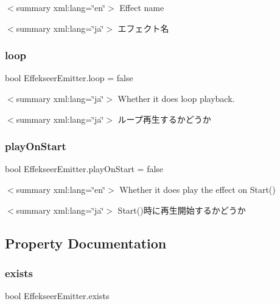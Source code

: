 $<$summary xml\+:lang=\char`\"{}en\char`\"{}$>$ Effect name 

$<$summary xml\+:lang=\char`\"{}ja\char`\"{}$>$ エフェクト名 \mbox{\label{class_effekseer_emitter_a9b6a18e54c4b4a68bb9b81fc88b123bd}} 
\subsubsection{\texorpdfstring{loop}{loop}}
{\footnotesize\ttfamily bool Effekseer\+Emitter.\+loop = false}

$<$summary xml\+:lang=\char`\"{}ja\char`\"{}$>$ Whether it does loop playback. 

$<$summary xml\+:lang=\char`\"{}ja\char`\"{}$>$ ループ再生するかどうか \mbox{\label{class_effekseer_emitter_a8ff5bc48852b4a21e3b33b0cd0e8b65a}} 
\subsubsection{\texorpdfstring{play\+On\+Start}{playOnStart}}
{\footnotesize\ttfamily bool Effekseer\+Emitter.\+play\+On\+Start = false}

$<$summary xml\+:lang=\char`\"{}en\char`\"{}$>$ Whether it does play the effect on Start() 

$<$summary xml\+:lang=\char`\"{}ja\char`\"{}$>$ Start()時に再生開始するかどうか 

\subsection{Property Documentation}
\mbox{\label{class_effekseer_emitter_aa4b49f6d532b7e75f2d207866ecee574}} 
\subsubsection{\texorpdfstring{exists}{exists}}
{\footnotesize\ttfamily bool Effekseer\+Emitter.\+exists\hspace{0.3cm}{\ttfamily [get]}}

